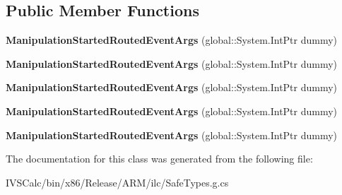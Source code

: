 \subsection*{Public Member Functions}
\begin{DoxyCompactItemize}
\item 
\mbox{\label{class_windows_1_1_u_i_1_1_xaml_1_1_input_1_1_manipulation_started_routed_event_args_a7a810e40fc548b22e1a2fc7392ef763b}} 
{\bfseries Manipulation\+Started\+Routed\+Event\+Args} (global\+::\+System.\+Int\+Ptr dummy)
\item 
\mbox{\label{class_windows_1_1_u_i_1_1_xaml_1_1_input_1_1_manipulation_started_routed_event_args_a7a810e40fc548b22e1a2fc7392ef763b}} 
{\bfseries Manipulation\+Started\+Routed\+Event\+Args} (global\+::\+System.\+Int\+Ptr dummy)
\item 
\mbox{\label{class_windows_1_1_u_i_1_1_xaml_1_1_input_1_1_manipulation_started_routed_event_args_a7a810e40fc548b22e1a2fc7392ef763b}} 
{\bfseries Manipulation\+Started\+Routed\+Event\+Args} (global\+::\+System.\+Int\+Ptr dummy)
\item 
\mbox{\label{class_windows_1_1_u_i_1_1_xaml_1_1_input_1_1_manipulation_started_routed_event_args_a7a810e40fc548b22e1a2fc7392ef763b}} 
{\bfseries Manipulation\+Started\+Routed\+Event\+Args} (global\+::\+System.\+Int\+Ptr dummy)
\item 
\mbox{\label{class_windows_1_1_u_i_1_1_xaml_1_1_input_1_1_manipulation_started_routed_event_args_a7a810e40fc548b22e1a2fc7392ef763b}} 
{\bfseries Manipulation\+Started\+Routed\+Event\+Args} (global\+::\+System.\+Int\+Ptr dummy)
\end{DoxyCompactItemize}


The documentation for this class was generated from the following file\+:\begin{DoxyCompactItemize}
\item 
I\+V\+S\+Calc/bin/x86/\+Release/\+A\+R\+M/ilc/Safe\+Types.\+g.\+cs\end{DoxyCompactItemize}
